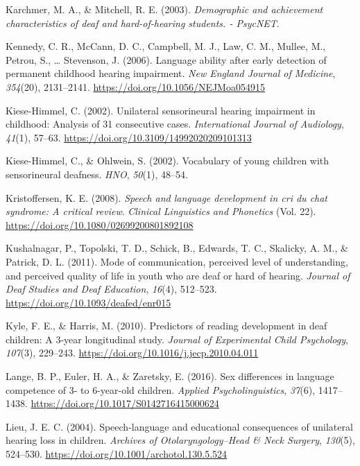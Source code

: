 \documentclass[english,man]{apa6}
\begin{document}
\leavevmode\hypertarget{ref-karchmer2003}{}%
Karchmer, M. A., \& Mitchell, R. E. (2003). \emph{Demographic and achievement characteristics of deaf and hard-of-hearing students. - PsycNET}.

\leavevmode\hypertarget{ref-kennedy2006}{}%
Kennedy, C. R., McCann, D. C., Campbell, M. J., Law, C. M., Mullee, M., Petrou, S., \ldots{} Stevenson, J. (2006). Language ability after early detection of permanent childhood hearing impairment. \emph{New England Journal of Medicine}, \emph{354}(20), 2131--2141. \url{https://doi.org/10.1056/NEJMoa054915}

\leavevmode\hypertarget{ref-kiese-himmel2002}{}%
Kiese-Himmel, C. (2002). Unilateral sensorineural hearing impairment in childhood: Analysis of 31 consecutive cases. \emph{International Journal of Audiology}, \emph{41}(1), 57--63. \url{https://doi.org/10.3109/14992020209101313}

\leavevmode\hypertarget{ref-kiese-himmel2002a}{}%
Kiese-Himmel, C., \& Ohlwein, S. (2002). Vocabulary of young children with sensorineural deafness. \emph{HNO}, \emph{50}(1), 48--54.

\leavevmode\hypertarget{ref-kristoffersen2008}{}%
Kristoffersen, K. E. (2008). \emph{Speech and language development in cri du chat syndrome: A critical review}. \emph{Clinical Linguistics and Phonetics} (Vol. 22). \url{https://doi.org/10.1080/02699200801892108}

\leavevmode\hypertarget{ref-kushalnagar2011}{}%
Kushalnagar, P., Topolski, T. D., Schick, B., Edwards, T. C., Skalicky, A. M., \& Patrick, D. L. (2011). Mode of communication, perceived level of understanding, and perceived quality of life in youth who are deaf or hard of hearing. \emph{Journal of Deaf Studies and Deaf Education}, \emph{16}(4), 512--523. \url{https://doi.org/10.1093/deafed/enr015}

\leavevmode\hypertarget{ref-kyle2010}{}%
Kyle, F. E., \& Harris, M. (2010). Predictors of reading development in deaf children: A 3-year longitudinal study. \emph{Journal of Experimental Child Psychology}, \emph{107}(3), 229--243. \url{https://doi.org/10.1016/j.jecp.2010.04.011}

\leavevmode\hypertarget{ref-lange2016}{}%
Lange, B. P., Euler, H. A., \& Zaretsky, E. (2016). Sex differences in language competence of 3- to 6-year-old children. \emph{Applied Psycholinguistics}, \emph{37}(6), 1417--1438. \url{https://doi.org/10.1017/S0142716415000624}

\leavevmode\hypertarget{ref-lieu2004}{}%
Lieu, J. E. C. (2004). Speech-language and educational consequences of unilateral hearing loss in children. \emph{Archives of Otolaryngology--Head \& Neck Surgery}, \emph{130}(5), 524--530. \url{https://doi.org/10.1001/archotol.130.5.524}
\end{document}
